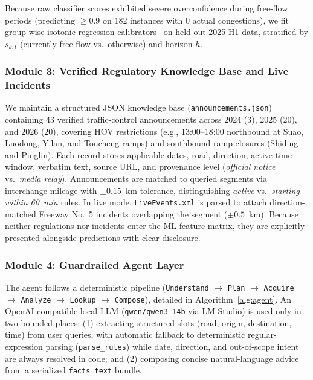 Because raw classifier scores exhibited severe overconfidence during free-flow periods (predicting $\ge 0.9$ on 182 instances with 0 actual congestions), we fit group-wise isotonic regression calibrators~\cite{zadrozny2002isotonic} on held-out 2025 H1 data, stratified by $s_{k,t}$ (currently free-flow vs.\ otherwise) and horizon $h$.

\subsubsection{Module 3: Verified Regulatory Knowledge Base and Live Incidents}
We maintain a structured JSON knowledge base (\texttt{announcements.json}) containing 43 verified traffic-control announcements across 2024 (3), 2025 (20), and 2026 (20), covering HOV restrictions (e.g., 13:00--18:00 northbound at Suao, Luodong, Yilan, and Toucheng ramps) and southbound ramp closures (Shiding and Pinglin). Each record stores applicable dates, road, direction, active time window, verbatim text, source URL, and provenance level (\textit{official notice} vs.\ \textit{media relay}). Announcements are matched to queried segments via interchange mileage with $\pm 0.15$~km tolerance, distinguishing \textit{active} vs.\ \textit{starting within 60~min} rules. In live mode, \texttt{LiveEvents.xml} is parsed to attach direction-matched Freeway No.~5 incidents overlapping the segment ($\pm 0.5$~km). Because neither regulations nor incidents enter the ML feature matrix, they are explicitly presented alongside predictions with clear disclosure.

\subsubsection{Module 4: Guardrailed Agent Layer}
The agent follows a deterministic pipeline (\texttt{Understand} $\rightarrow$ \texttt{Plan} $\rightarrow$ \texttt{Acquire} $\rightarrow$ \texttt{Analyze} $\rightarrow$ \texttt{Lookup} $\rightarrow$ \texttt{Compose}), detailed in Algorithm~\ref{alg:agent}. An OpenAI-compatible local LLM (\texttt{qwen/qwen3-14b} via LM Studio) is used only in two bounded places: (1) extracting structured slots (road, origin, destination, time) from user queries, with automatic fallback to deterministic regular-expression parsing (\texttt{parse\_rules}) while date, direction, and out-of-scope intent are always resolved in code; and (2) composing concise natural-language advice from a serialized \texttt{facts\_text} bundle.

